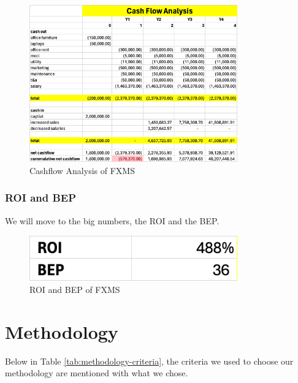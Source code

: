 \documentclass[a4paper]{report}
\begin{document}
\begin{figure}[h!]
    \centering
    \includegraphics[width=0.8\textwidth]{images/cash-flow-analysis.png}
    \caption{Cashflow Analysis of FXMS}
    \label{fig:cash-flow-analysis}
\end{figure}

\subsection{ROI and BEP}

We will move to the big numbers, the ROI and the BEP.

\begin{figure}[h!]
    \centering
    \includegraphics[width=0.8\textwidth]{images/roi-bep.png}
    \caption{ROI and BEP of FXMS}
    \label{fig:roi-and-bep}
\end{figure}

\chapter{Methodology}

Below in Table \ref{tab:methodology-criteria}, the criteria we used to choose our methodology are mentioned with what we chose. 
\end{document}
